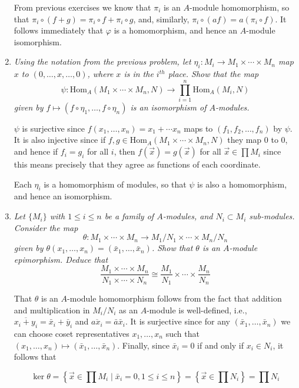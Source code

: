 \documentclass[10pt]{article}
\newcommand{\Hom}{\text{Hom}}
\newcommand{\iso}{\cong}
\begin{document}
\begin{enumerate}
From previous exercises we know that $\pi_i$ is an $A$-module homomorphism, so that $\pi_i \circ (f+g) = \pi_i \circ f + \pi_i \circ g$, and, similarly, $\pi_i \circ (af) = a(\pi_i \circ f)$.  It follows immediately that $\varphi$ is a homomorphism, and hence an $A$-module isomorphism.

\item \emph{Using the notation from the previous problem, let $\eta_i: M_i \rightarrow M_1 \times \cdots \times M_n$ map $x$ to $(0, \ldots, x, \ldots, 0)$, where $x$ is in the $i^{th}$ place.  Show that the map $$\psi: \Hom_A(M_1 \times \cdots \times M_n, N) \rightarrow \prod_{i=1}^n \Hom_A(M_i, N)$$ given by $f \mapsto (f \circ \eta_1, \ldots, f \circ \eta_n)$ is an isomorphism of $A$-modules.}

$\psi$ is surjective since $f(x_1, \ldots, x_n) = x_1 + \cdots x_n$ maps to $(f_1, f_2, \ldots, f_n)$ by $\psi$.  It is also injective since if $f,g \in \Hom_A(M_1 \times \cdots \times M_n, N)$ they map $0$ to $0$, and hence if $f_i = g_i$ for all $i$, then $f(\vec{x}) = g(\vec{x})$ for all $\vec{x} \in \prod M_i$ since this means precisely that they agree as functions of each coordinate.

Each $\eta_i$ is a homomorphism of modules, so that $\psi$ is also a homomorphism, and hence an isomorphism. 
\item \emph{Let $\{M_i\}$ with $1 \leq i \leq n$ be a family of $A$-modules, and $N_i \subset M_i$ sub-modules.  Consider the map $$\theta: M_1 \times \cdots \times M_n \rightarrow M_1/N_1 \times \cdots \times M_n/N_n$$ given by $\theta(x_1, \ldots, x_n) = (\bar{x}_1, \ldots, \bar{x}_n)$.  Show that $\theta$ is an $A$-module epimorphism.  Deduce that $$\frac{M_1 \times \cdots \times M_n}{N_1 \times \cdots \times N_n} \iso \frac{M_1}{N_1} \times \cdots \times \frac{M_n}{N_n}$$}

That $\theta$ is an $A$-module homomorphism follows from the fact that addition and multiplication in $M_i/N_i$ as an $A$-module is well-defined, i.e., $\overline{x_i+y_i} = \bar{x}_i + \bar{y}_i$ and $\overline{ax_i} = \bar{a}\bar{x}_i$.  It is surjective since for any $(\bar{x}_1, \ldots, \bar{x}_n)$ we can choose coset representatives $x_1, \ldots, x_n$ such that $(x_1, \ldots, x_n) \mapsto (\bar{x}_1, \ldots, \bar{x}_n)$.  Finally, since $\bar{x}_i = 0$ if and only if $x_i \in N_i$, it follows that 

\[
\ker \theta = \left\{\vec{x} \in \prod M_i \mid \bar{x}_i = 0, 1 \leq i \leq n\right\} = \left\{\vec{x} \in \prod N_i\right\} = \prod N_i
\]


\end{enumerate}
\end{document}
